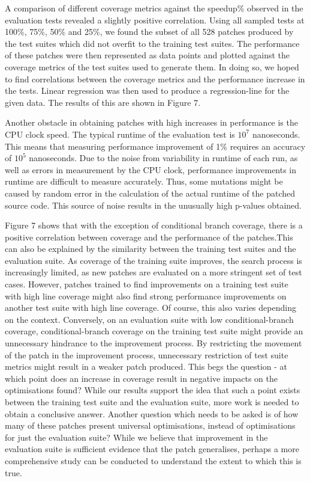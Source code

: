 \documentclass[titlepage]{article}
\begin{document}
A comparison of different coverage metrics against the speedup\% observed in the evaluation tests revealed a slightly positive correlation. Using all sampled tests at 100\%, 75\%, 50\% and 25\%, we found the subset of all 528 patches produced by the test suites which did not overfit to the training test suites. The performance of these patches were then represented as data points and plotted against the coverage metrics of the test suites used to generate them. In doing so, we hoped to find correlations between the coverage metrics and the performance increase in the tests. Linear regression was then used to produce a regression-line for the given data. The results of this are shown in Figure 7. 

Another obstacle in obtaining patches with high increases in performance is the CPU clock speed. The typical runtime of the evaluation test is $10^7$ nanoseconds. This means that measuring performance improvement of 1\% requires an accuracy of $10^5$ nanoseconds. Due to the noise from variability in runtime of each run, as well as errors in measurement by the CPU clock, performance improvements in runtime are difficult to measure accurately. Thus, some mutations might be caused by random error in the calculation of the actual runtime of the patched source code. This source of noise results in the unusually high p-values obtained.

Figure 7 shows that with the exception of conditional branch coverage, there is a positive correlation between coverage and the performance of the patches.This can also be explained by the similarity between the training test suites and the evaluation suite. As coverage of the training suite improves, the search process is increasingly limited, as new patches are evaluated on a more stringent set of test cases. However, patches trained to find improvements on a training test suite with high line coverage might also find strong performance improvements on another test suite with high line coverage. Of course, this also varies depending on the context. Conversely, on an evaluation suite with low conditional-branch coverage, conditional-branch coverage on the training test suite might provide an unnecessary hindrance to the improvement process. By restricting the movement of the patch in the improvement process, unnecessary restriction of test suite metrics might result in a weaker patch produced. This begs the question - at which point does an increase in coverage result in negative impacts on the optimisations found? While our results support the idea that such a point exists between the training test suite and the evaluation suite,  more work is needed to obtain a conclusive answer. Another question which needs to be asked is of how many of these patches present universal optimisations, instead of optimisations for just the evaluation suite? While we believe that improvement in the evaluation suite is sufficient evidence that the patch generalises, perhaps a more comprehensive study can be conducted to understand the extent to which this is true.\\
\end{document}
